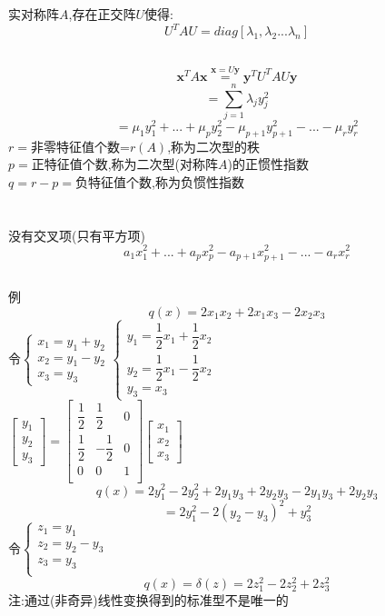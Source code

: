\documentclass[11pt, a4paper, UTF8]{ctexart}
\begin{document}
\section{}
\subsection{}
实对称阵$A$,存在正交阵$U$使得:
\[U^TAU=diag[\lambda_1,\lambda_2...\lambda_n]\]
\subsection{}
\[\bm x^TA\bm x\overset{\bm x=U\bm y}{=}\bm y^TU^TAU\bm y\]
\[=\sum_{j=1}^n\lambda_jy^2_j\]
\[=\mu_1y_1^2+...+\mu_py_2^2-\mu_{p+1}y_{p+1}^2-...-\mu_ry_r^2\]
$r=$非零特征值个数=$r(A)$,称为二次型的秩\\
$p=$正特征值个数,称为二次型(对称阵$A$)的正惯性指数\\
$q=r-p=$负特征值个数,称为负惯性指数\\
\section{}
没有交叉项(只有平方项)
\[a_1x_1^2+...+a_px_p^2-a_{p+1}x_{p+1}^2-...-a_rx_r^2\]
\subsection{}
例\\
\[q(x)=2x_1x_2+2x_1x_3-2x_2x_3\]
令$\begin{cases}
x_1=y_1+y_2\\
x_2=y_1-y_2\\
x_3=y_3
\end{cases}\begin{cases}
y_1=\dfrac{1}{2}x_1+\dfrac{1}{2}x_2\\
y_2=\dfrac{1}{2}x_1-\dfrac{1}{2}x_2\\
y_3=x_3
\end{cases}$\\
$\begin{bmatrix}
y_1\\
y_2\\
y_3
\end{bmatrix}=\begin{bmatrix}
\dfrac{1}{2}&\dfrac{1}{2}&0\\
\dfrac{1}{2}&-\dfrac{1}{2}&0\\
0&0&1\\
\end{bmatrix}\begin{bmatrix}
x_1\\
x_2\\
x_3
\end{bmatrix}$
\[q(x)=2y_1^2-2y_2^2+2y_1y_3+2y_2y_3-2y_1y_3+2y_2y_3\]
\[=2y_1^2-2(y_2-y_3)^2+y_3^2\]
令$\begin{cases}
z_1=y_1\\
z_2=y_2-y_3\\
z_3=y_3\\
\end{cases}$
\[q(x)=\delta(z)=2z_1^2-2z_2^2+2z_3^2\]
注:通过(非奇异)线性变换得到的标准型不是唯一的
\end{document}
